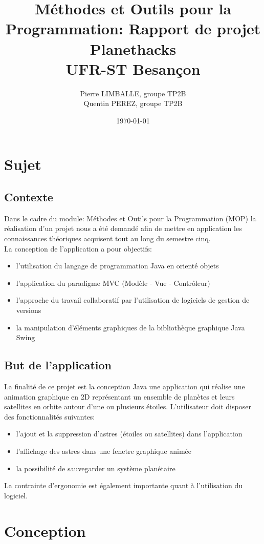 \documentclass[a4paper,10pt]{article}
\title{Méthodes et Outils pour la Programmation: Rapport de projet \\%
Planethacks \\%
UFR-ST Besançon}
\author{Pierre LIMBALLE, groupe TP2B \\ Quentin PEREZ, groupe TP2B}
\date{\today}
\begin{document}
\maketitle

\section{Sujet}
\subsection{Contexte}
Dans le cadre du module: Méthodes et Outils pour la Programmation (MOP) la réalisation d'un projet nous a été demandé afin de mettre
en application les connaissances théoriques acquisent tout au long du semestre cinq. \\
La conception de l'application a pour objectifs:
\begin{itemize}
  \item l'utilisation du langage de programmation Java en orienté objets
  \item l'application du paradigme MVC (Modèle - Vue - Contrôleur)
  \item l'approche du travail collaboratif par l'utilisation de logiciels de gestion de versions
  \item la manipulation d'éléments graphiques de la bibliothèque graphique Java Swing
\end{itemize}

\subsection{But de l'application}
La finalité de ce projet est la conception Java une application qui réalise une animation graphique en 2D 
représentant un ensemble de planètes et leurs satellites en orbite autour d'une ou plusieurs étoiles.
L'utilisateur doit disposer des fonctionnalités suivantes:
\begin{itemize}
  \item l'ajout et la suppression d'astres (étoiles ou satellites) dans l'application
  \item l'affichage des astres dans une fenetre graphique animée
  \item la possibilité de sauvegarder un système planétaire 
\end{itemize}
La contrainte d'ergonomie est également importante quant à l'utilisation du logiciel.

\section{Conception}
\end{document}
